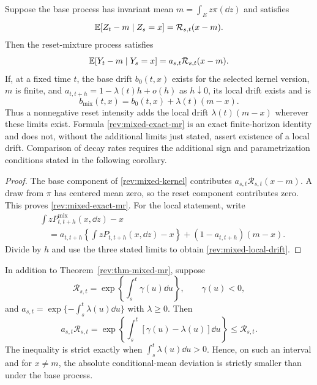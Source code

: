 \begin{theorem}
\label{rev:thm-mixed-mr}
Suppose the base process has invariant mean
$m=\int_Ez\pi(\dd z)$ and satisfies
\begin{equation}
\mathbb E[Z_t-m\mid Z_s=x]=\mathcal R_{s,t}(x-m).
\label{rev:base-mr-for-mix}
\end{equation}
Then the reset-mixture process satisfies
\begin{equation}
\mathbb E[Y_t-m\mid Y_s=x]=a_{s,t}\mathcal R_{s,t}(x-m).
\label{rev:mixed-exact-mr}
\end{equation}
If, at a fixed time $t$, the base drift $b_0(t,x)$ exists for the selected
kernel version, $m$ is finite, and
$a_{t,t+h}=1-\lambda(t)h+o(h)$ as $h\downarrow0$, its local drift exists and is
\begin{equation}
b_{\mathrm{mix}}(t,x)=b_0(t,x)+\lambda(t)(m-x).
\label{rev:mixed-local-drift}
\end{equation}
Thus a nonnegative reset intensity adds the local drift
$\lambda(t)(m-x)$ wherever these limits exist.  Formula
\eqref{rev:mixed-exact-mr} is an exact finite-horizon identity and does not,
without the additional limits just stated, assert existence of a local drift.
Comparison of decay rates requires the additional sign and parametrization
conditions stated in the following corollary.
\end{theorem}

\begin{proof}
The base component of \eqref{rev:mixed-kernel} contributes
$a_{s,t}\mathcal R_{s,t}(x-m)$.  A draw from $\pi$ has centered mean zero, so the reset
component contributes zero.  This proves \eqref{rev:mixed-exact-mr}.  For the
local statement, write
\begin{align*}
&\int zP^{\mathrm{mix}}_{t,t+h}(x,\dd z)-x\\
&\quad=a_{t,t+h}\left\{\int zP_{t,t+h}(x,\dd z)-x\right\}
 +(1-a_{t,t+h})(m-x).
\end{align*}
Divide by $h$ and use the three stated limits to obtain
\eqref{rev:mixed-local-drift}.
\end{proof}

\begin{corollary}
\label{rev:cor-mixed-acceleration}
In addition to Theorem~\ref{rev:thm-mixed-mr}, suppose
\[
 \mathcal R_{s,t}=\exp\!\left\{\int_s^t\gamma(u)\dd u\right\},
 \qquad \gamma(u)<0,
\]
and $a_{s,t}=\exp\{-\int_s^t\lambda(u)\dd u\}$ with $\lambda\ge0$.
Then
\[
 a_{s,t}\mathcal R_{s,t}
 =\exp\!\left\{\int_s^t[\gamma(u)-\lambda(u)]\dd u\right\}
 \le \mathcal R_{s,t}.
\]
The inequality is strict exactly when
$\int_s^t\lambda(u)\dd u>0$.  Hence, on such an interval and for $x\ne m$,
the absolute conditional-mean deviation is strictly smaller than under the
base process.
\end{corollary}

